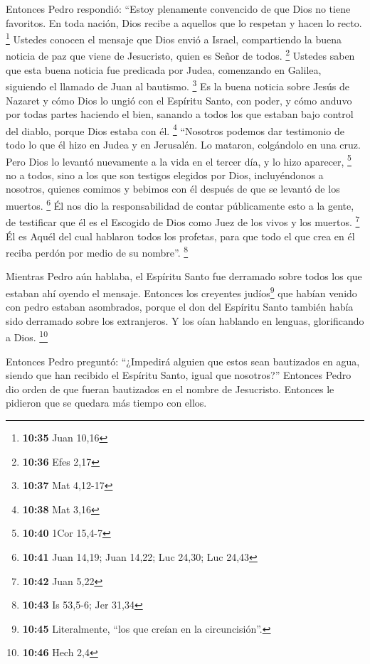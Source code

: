 Entonces Pedro respondió: ``Estoy plenamente convencido
de que Dios no tiene favoritos.  En toda nación, Dios
recibe a aquellos que lo respetan y hacen lo recto. \footnote{\textbf{10:35}
  Juan 10,16}  Ustedes conocen el mensaje que Dios envió
a Israel, compartiendo la buena noticia de paz que viene de Jesucristo,
quien es Señor de todos. \footnote{\textbf{10:36} Efes 2,17}
 Ustedes saben que esta buena noticia fue predicada por
Judea, comenzando en Galilea, siguiendo el llamado de Juan al bautismo.
\footnote{\textbf{10:37} Mat 4,12-17}  Es la buena
noticia sobre Jesús de Nazaret y cómo Dios lo ungió con el Espíritu
Santo, con poder, y cómo anduvo por todas partes haciendo el bien,
sanando a todos los que estaban bajo control del diablo, porque Dios
estaba con él. \footnote{\textbf{10:38} Mat 3,16} 
``Nosotros podemos dar testimonio de todo lo que él hizo en Judea y en
Jerusalén. Lo mataron, colgándolo en una cruz.  Pero Dios
lo levantó nuevamente a la vida en el tercer día, y lo hizo aparecer,
\footnote{\textbf{10:40} 1Cor 15,4-7}  no a todos, sino a
los que son testigos elegidos por Dios, incluyéndonos a nosotros,
quienes comimos y bebimos con él después de que se levantó de los
muertos. \footnote{\textbf{10:41} Juan 14,19; Juan 14,22; Luc 24,30; Luc
  24,43}  Él nos dio la responsabilidad de contar
públicamente esto a la gente, de testificar que él es el Escogido de
Dios como Juez de los vivos y los muertos. \footnote{\textbf{10:42} Juan
  5,22}  Él es Aquél del cual hablaron todos los
profetas, para que todo el que crea en él reciba perdón por medio de su
nombre''. \footnote{\textbf{10:43} Is 53,5-6; Jer 31,34}

 Mientras Pedro aún hablaba, el Espíritu Santo fue
derramado sobre todos los que estaban ahí oyendo el mensaje.
 Entonces los creyentes judíos\footnote{\textbf{10:45}
  Literalmente, ``los que creían en la circuncisión''.} que habían
venido con pedro estaban asombrados, porque el don del Espíritu Santo
también había sido derramado sobre los extranjeros.  Y
los oían hablando en lenguas, glorificando a Dios. \footnote{\textbf{10:46}
  Hech 2,4}

 Entonces Pedro preguntó: ``¿Impedirá alguien que estos
sean bautizados en agua, siendo que han recibido el Espíritu Santo,
igual que nosotros?''  Entonces Pedro dio orden de que
fueran bautizados en el nombre de Jesucristo. Entonces le pidieron que
se quedara más tiempo con ellos.

